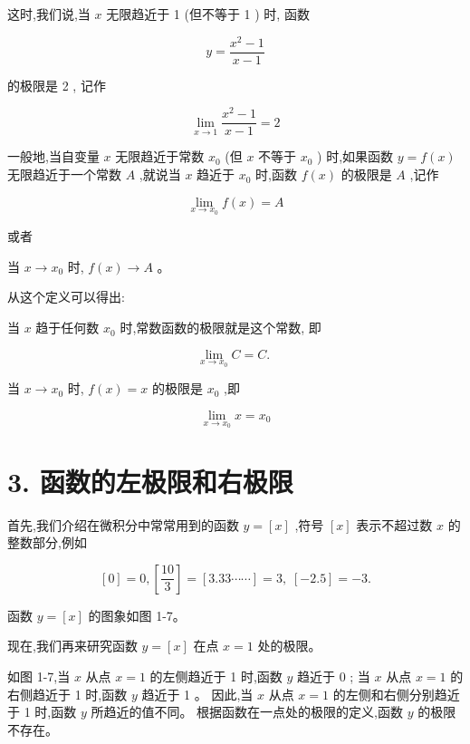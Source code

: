 \documentclass[lang=cn,newtx,12pt,scheme=chinese]{elegantbook}
\begin{document}
这时,我们说,当 \(x\) 无限趋近于 1 (但不等于 1 ) 时, 函数

\[
y = \frac{{x}^{2} - 1}{x - 1}
\]

的极限是 2 , 记作

\[
\mathop{\lim }\limits_{{x \rightarrow 1}}\frac{{x}^{2} - 1}{x - 1} = 2
\]

\begin{definition} 

一般地,当自变量 \(x\) 无限趋近于常数 \({x}_{0}\) (但 \(x\) 不等于 \({x}_{0}\) ) 时,如果函数 \(y = f\left( x\right)\) 无限趋近于一个常数 \(A\) ,就说当 \(x\) 趋近于 \({x}_{0}\) 时,函数 \(f\left( x\right)\) 的极限是 \(A\) ,记作

\[
\mathop{\lim }\limits_{{x \rightarrow {x}_{0}}}f\left( x\right) = A
\]

或者

当 \(x \rightarrow {x}_{0}\) 时, \(f\left( x\right) \rightarrow A\) 。

\end{definition}

从这个定义可以得出:

当 \(x\) 趋于任何数 \({x}_{0}\) 时,常数函数的极限就是这个常数, 即

\[
\mathop{\lim }\limits_{{x \rightarrow {x}_{0}}}C = C\text{. }
\]

当 \(x \rightarrow {x}_{0}\) 时, \(f\left( x\right) = x\) 的极限是 \({x}_{0}\) ,即

\[
\mathop{\lim }\limits_{{x \rightarrow {x}_{0}}}x = {x}_{0}
\]

\section*{3. 函数的左极限和右极限}

首先,我们介绍在微积分中常常用到的函数 \(y = \left\lbrack x\right\rbrack\) ,符号 \(\left\lbrack x\right\rbrack\) 表示不超过数 \(x\) 的整数部分,例如

\[
\left\lbrack 0\right\rbrack = 0,\left\lbrack \frac{10}{3}\right\rbrack = \left\lbrack {{3.33}\cdots \cdots }\right\rbrack = 3,\;\left\lbrack {-{2.5}}\right\rbrack = - 3.
\]

函数 \(y = \left\lbrack x\right\rbrack\) 的图象如图 1-7。

现在,我们再来研究函数 \(y = \left\lbrack x\right\rbrack\) 在点 \(x = 1\) 处的极限。

如图 1-7,当 \(x\) 从点 \(x = 1\) 的左侧趋近于 1 时,函数 \(y\) 趋近于 0 ; 当 \(x\) 从点 \(x = 1\) 的右侧趋近于 1 时,函数 \(y\) 趋近于 1 。 因此,当 \(x\) 从点 \(x = 1\) 的左侧和右侧分别趋近于 1 时,函数 \(y\) 所趋近的值不同。 根据函数在一点处的极限的定义,函数 \(y\) 的极限不存在。
\end{document}
